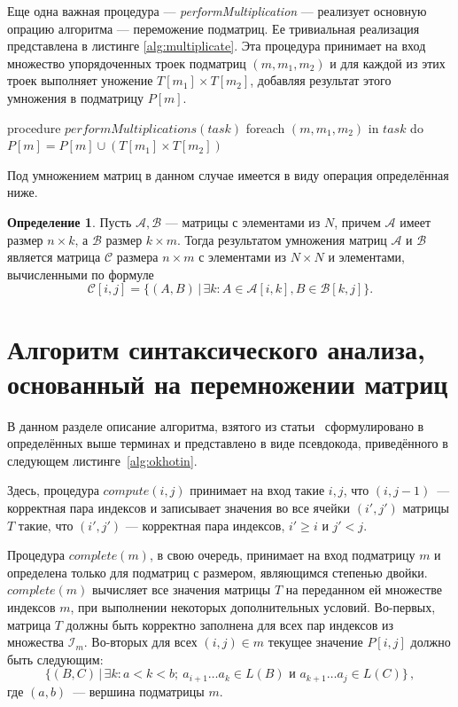 \documentclass[a4paper,12pt]{article}  %
\theoremstyle{definition}
\newtheorem{definition}{Определение}[section]
\theoremstyle{remark}
\begin{document}
Еще одна важная процедура --- \textit{performMultiplication} --- реализует основную опрацию алгоритма --- переможение подматриц. Ее тривиальная реализация представлена в листинге \ref{alg:multiplicate}. Эта процедура принимает на вход множество упорядоченных троек подматриц $(m, m_1, m_2)$ и для каждой из этих троек выполняет уножение $T[m_1] \times T[m_2]$, добавляя результат этого умножения в подматрицу $P[m]$.


\begin{algorithm}[caption={Процедура, использующаяся для перемножения матриц}, label={alg:multiplicate}] 
procedure $performMultiplications(task)$
  foreach $(m,m_1,m_2)$ in $task$ do
    $P[m] = P[m] \cup \left(T[m_1] \times T[m_2]\right)$
\end{algorithm}

Под умножением матриц в данном случае имеется в виду операция определённая ниже. 
\begin{definition} 
Пусть $\mathcal{A},\mathcal{B}$ --- матрицы с элементами из $N$, причем $\mathcal{A}$ имеет размер $n\times k$, а $\mathcal{B}$ размер $k\times m$. Тогда результатом умножения матриц $\mathcal{A}$ и $\mathcal{B}$ является матрица $\mathcal{C}$ размера $n \times m$ с элементами из $N\times N$ и элементами, вычисленными по формуле 
$$
\mathcal{C}[i,j] = \{(A,B)\,|\,\exists k: A\in \mathcal{A}[i,k], B\in \mathcal{B}[k,j]\}.
$$
\end{definition}

\section{Алгоритм синтаксического анализа, основанный на перемножении матриц}
\label{se:okhotin}

В данном разделе описание алгоритма, взятого из статьи~\cite{okhotin13} сформулировано в определённых выше терминах и представлено в виде псевдокода, приведённого в следующем листинге~\ref{alg:okhotin}. 

Здесь, процедура $compute(i, j)$ принимает на вход такие $i, j$, что \linebreak $(i,j-1)$~--- корректная пара индексов и записывает значения во все ячейки $(i', j')$ матрицы $T$ такие, что $(i', j')$ --- корректная пара индексов, $i' \geqslant i$ и $j' < j$. 

Процедура $complete(m)$, в свою очередь, принимает на вход подматрицу $m$ и определена только для подматриц с размером, являющимся степенью двойки. $complete(m)$ вычисляет все значения матрицы $T$ на переданном ей множестве индексов $m$, при выполнении некоторых дополнительных условий. Во-первых, матрица $T$ должны быть корректно заполнена для всех пар индексов из множества $\mathcal{I}_m$. Во-вторых для всех $(i,j) \in m$ текущее значение $P[i,j]$ должно быть следующим:
$$\{(B,C)\,|\,\exists k: a < k < b;\ a_{i+1}\dots a_k \in L(B) \mbox{ и } a_{k+1}\dots a_j \in L(C)\}\,,$$
где $(a,b)$~--- вершина подматрицы $m$.
\end{document}
